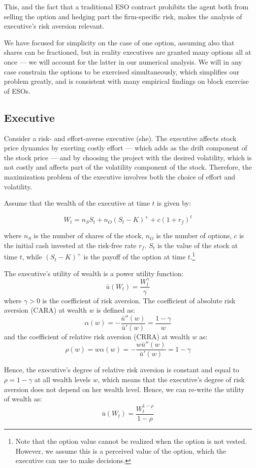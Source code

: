 This, and the fact that a traditional ESO contract prohibits the agent both from selling the option and hedging part the firm-specific risk, makes the analysis of executive's risk aversion relevant.

We have focused for simplicity on the case of one option, assuming also that shares can be fractioned, but in reality executives are granted many options all at once --- we will account for the latter in our numerical analysis. We will in any case constrain the options to be exercised simultaneously, which simplifies our problem greatly, and is consistent with many empirical findings on block exercise of ESOs.


\subsection{Executive}
Consider a risk- and effort-averse executive (she). The executive affects stock price dynamics by exerting costly effort --- which adds as the drift component of the stock price --- and by choosing the project with the desired volatility, which is not costly and affects part of the volatility component of the stock. Therefore, the maximization problem of the executive involves both the choice of effort and volatility. 

Assume that the wealth of the executive at time $t$ is given by: 

$$ W_t = n_S S_t + n_O (S_t-K)^+ + c(1+r_f)^t   $$ 

where $n_S$ is the number of shares of the stock, $n_O$ is the number of options, $c$ is the initial cash invested at the risk-free rate $r_f$. $S_t$ is the value of the stock at time $t$, while $(S_t-K)^+$ is the payoff of the option at time $t$.\footnote{Note that the option value cannot be realized when the option is not vested. However, we assume this is a perceived value of the option, which the executive can use to make decisions.}

The executive's utility of wealth is a power utility function:
$$ \bar{u}(W_t) = \frac{W_t^{\gamma}}{\gamma} $$
where $\gamma > 0$ is the coefficient of risk aversion. The coefficient of absolute risk aversion (CARA) at wealth $w$ is defined as:
$$ \alpha(w) = -\frac{\bar{u}''(w)}{\bar{u}'(w)} = \frac{1-\gamma}{w} $$
and the coefficient of relative risk aversion (CRRA) at wealth $w$ as:
$$ \rho(w) = w \alpha(w) = -\frac{w\bar{u}''(w)}{\bar{u}'(w)} = 1-\gamma $$

Hence, the executive's degree of relative risk aversion is constant and equal to $\rho = 1-\gamma$ at all wealth levels $w$, which means that the executive's degree of risk aversion does not depend on her wealth level. Hence, we can re-write the utility of wealth as:
$$ \bar{u}(W_t) = \frac{W_t^{1-\rho}}{1-\rho} $$

